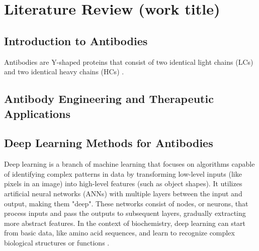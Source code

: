 \chapter{Literature Review (work title)} \label{theorie}


\section{Introduction to Antibodies}


Antibodies are Y-shaped proteins that consist of two identical light chains (LCs) and two identical heavy chains (HCs) \citep{Chiu2019}.


\section{Antibody Engineering and Therapeutic Applications}


\section{Deep Learning Methods for Antibodies}

Deep learning is a branch of machine learning that focuses on algorithms capable of identifying complex patterns in data by transforming low-level inputs (like pixels in an image) into high-level features (such as object shapes). It utilizes artificial neural networks (ANNs) with multiple layers between the input and output, making them "deep". These networks consist of nodes, or neurons, that process inputs and pass the outputs to subsequent layers, gradually extracting more abstract features. In the context of biochemistry, deep learning can start from basic data, like amino acid sequences, and learn to recognize complex biological structures or functions \citep{Graves2020}.

